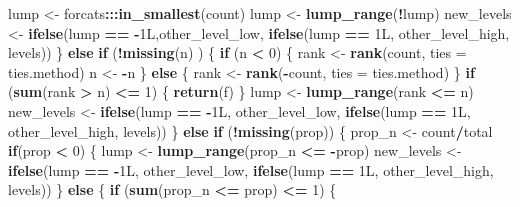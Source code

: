\documentclass[]{book}
\newenvironment{Shaded}{\begin{snugshade}}{\end{snugshade}}
\newcommand{\ControlFlowTok}[1]{\textcolor[rgb]{0.13,0.29,0.53}{\textbf{#1}}}
\newcommand{\DataTypeTok}[1]{\textcolor[rgb]{0.13,0.29,0.53}{#1}}
\newcommand{\DecValTok}[1]{\textcolor[rgb]{0.00,0.00,0.81}{#1}}
\newcommand{\KeywordTok}[1]{\textcolor[rgb]{0.13,0.29,0.53}{\textbf{#1}}}
\newcommand{\NormalTok}[1]{#1}
\newcommand{\OperatorTok}[1]{\textcolor[rgb]{0.81,0.36,0.00}{\textbf{#1}}}
\newcommand{\StringTok}[1]{\textcolor[rgb]{0.31,0.60,0.02}{#1}}
\begin{document}
\begin{Shaded}
\begin{Highlighting}[]
\NormalTok{    lump <-}\StringTok{ }\NormalTok{forcats}\OperatorTok{:::}\KeywordTok{in_smallest}\NormalTok{(count)}
\NormalTok{    lump <-}\StringTok{ }\KeywordTok{lump_range}\NormalTok{(}\OperatorTok{!}\NormalTok{lump)}
\NormalTok{    new_levels <-}\StringTok{ }\KeywordTok{ifelse}\NormalTok{(lump }\OperatorTok{==}\StringTok{ }\OperatorTok{-}\NormalTok{1L,other_level_low, }\KeywordTok{ifelse}\NormalTok{(lump }\OperatorTok{==}\StringTok{ }\NormalTok{1L, other_level_high, levels))}
\NormalTok{  \} }\ControlFlowTok{else} \ControlFlowTok{if}\NormalTok{ (}\OperatorTok{!}\KeywordTok{missing}\NormalTok{(n) ) \{}
    \ControlFlowTok{if}\NormalTok{ (n }\OperatorTok{<}\StringTok{ }\DecValTok{0}\NormalTok{) \{}
\NormalTok{      rank <-}\StringTok{ }\KeywordTok{rank}\NormalTok{(count, }\DataTypeTok{ties =}\NormalTok{ ties.method)}
\NormalTok{      n <-}\StringTok{ }\OperatorTok{-}\NormalTok{n}
\NormalTok{    \} }\ControlFlowTok{else}\NormalTok{ \{}
\NormalTok{      rank <-}\StringTok{ }\KeywordTok{rank}\NormalTok{(}\OperatorTok{-}\NormalTok{count, }\DataTypeTok{ties =}\NormalTok{ ties.method)}
\NormalTok{    \}}
    \ControlFlowTok{if}\NormalTok{ (}\KeywordTok{sum}\NormalTok{(rank }\OperatorTok{>}\StringTok{ }\NormalTok{n) }\OperatorTok{<=}\StringTok{ }\DecValTok{1}\NormalTok{) \{}
      \KeywordTok{return}\NormalTok{(f)}
\NormalTok{    \}}
\NormalTok{    lump <-}\StringTok{ }\KeywordTok{lump_range}\NormalTok{(rank }\OperatorTok{<=}\StringTok{ }\NormalTok{n)}
\NormalTok{    new_levels <-}\StringTok{ }\KeywordTok{ifelse}\NormalTok{(lump }\OperatorTok{==}\StringTok{ }\OperatorTok{-}\NormalTok{1L, other_level_low, }\KeywordTok{ifelse}\NormalTok{(lump }\OperatorTok{==}\StringTok{ }\NormalTok{1L, other_level_high, levels))}
\NormalTok{  \} }\ControlFlowTok{else} \ControlFlowTok{if}\NormalTok{ (}\OperatorTok{!}\KeywordTok{missing}\NormalTok{(prop)) \{}
\NormalTok{    prop_n <-}\StringTok{ }\NormalTok{count}\OperatorTok{/}\NormalTok{total}
    \ControlFlowTok{if}\NormalTok{(prop }\OperatorTok{<}\StringTok{ }\DecValTok{0}\NormalTok{) \{}
\NormalTok{      lump <-}\StringTok{ }\KeywordTok{lump_range}\NormalTok{(prop_n }\OperatorTok{<=}\StringTok{ }\OperatorTok{-}\NormalTok{prop)}
\NormalTok{      new_levels <-}\StringTok{ }\KeywordTok{ifelse}\NormalTok{(lump }\OperatorTok{==}\StringTok{ }\OperatorTok{-}\NormalTok{1L, other_level_low, }\KeywordTok{ifelse}\NormalTok{(lump }\OperatorTok{==}\StringTok{ }\NormalTok{1L, other_level_high, levels))}
\NormalTok{    \} }\ControlFlowTok{else}\NormalTok{ \{}
      \ControlFlowTok{if}\NormalTok{ (}\KeywordTok{sum}\NormalTok{(prop_n }\OperatorTok{<=}\StringTok{ }\NormalTok{prop) }\OperatorTok{<=}\StringTok{ }\DecValTok{1}\NormalTok{) \{}

\end{Highlighting}
\end{Shaded}
\end{document}
